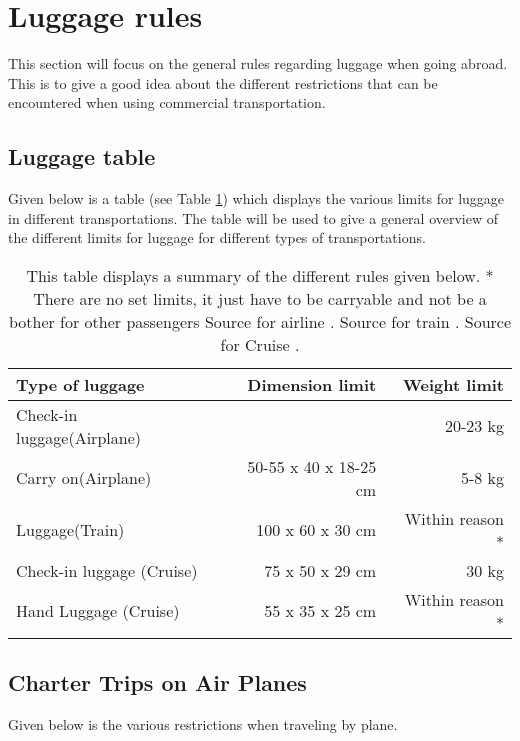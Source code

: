 \section{Luggage rules}
\label{sec:LugRules}
This section will focus on the general rules regarding luggage when going abroad. This is to give a good idea about the different restrictions that can be encountered when using commercial transportation.
\subsection{Luggage table}
Given below is a table (see Table \ref{tab:Lug}) which displays the various limits for luggage in different transportations. The table will be used to give a general overview of the different limits for luggage for different types of transportations.
\begin{table}[H]
\begin{center}
\begin{tabular}{| l | r | r |}
\hline
Type of luggage &  Dimension limit & Weight limit \\ \hline
Check-in luggage(Airplane) & & 20-23 kg \\ \hline
Carry on(Airplane) & 50-55 x 40 x 18-25 cm & 5-8 kg \\ \hline
Luggage(Train) & 100 x 60 x 30 cm & Within reason *\\ \hline
Check-in luggage (Cruise) & 75 x 50 x 29 cm & 30 kg \\ \hline
Hand Luggage (Cruise) & 55 x 35 x 25 cm & Within reason *\\ \hline
\end{tabular}
\caption{This table displays a summary of the different rules given below.\newline
* There are no set limits, it just have to be carryable and not be a bother for other passengers\newline
Source for airline \citep{SAS}. Source for train \citep{idianrules}. Source for Cruise \citep{Cruise}.}
\label{tab:Lug}
\end{center}
\end{table}

\subsection{Charter Trips on Air Planes}
Given below is the various restrictions when traveling by plane.

